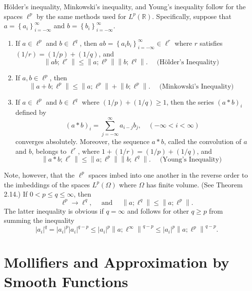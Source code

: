 Hölder's inequality, Minkowski's inequality, and Young's inequality follow for the spaces $\ell^p$ by the same methods used for $L^p(\mathbb{R})$. Specifically, suppose that $a=\left\{a_i\right\}_{i=-\infty}^{\infty}$ and $b=\left\{b_i\right\}_{i=-\infty}^{\infty}$.
\begin{enumerate}[label = (\alph*)]
  \item If $a \in \ell^p$ and $b \in \ell^q$, then $a b=\left\{a_i b_i\right\}_{i=-\infty}^{\infty} \in \ell^r$ where $r$ satisfies $(1 / r)=(1 / p)+(1 / q)$, and
  \[
  \left\|a b ; \ell^r\right\| \leq\left\|a ; \ell^p\right\|\left\|b ; \ell^q\right\| . \quad \text { (Hölder's Inequality) }
  \]
  \item If $a, b \in \ell^p$, then
  \[
  \left\|a+b ; \ell^p\right\| \leq\left\|a ; \ell^p\right\|+\left\|b ; \ell^p\right\| . \quad \text { (Minkowski's Inequality) }
  \]
  \item If $a \in \ell^p$ and $b \in \ell^q$ where $(1 / p)+(1 / q) \geq 1$, then the series $(a * b)_i$ defined by
  \[
  (a * b)_i=\sum_{j=-\infty}^{\infty} a_{i-j} b_j, \quad(-\infty<i<\infty)
  \]
  converges absolutely. Moreover, the sequence $a * b$, called the convolution of $a$ and $b$, belongs to $\ell^r$, where $1+(1 / r)=(1 / p)+(1 / q)$, and
  \[
  \left\|a * b ; \ell^r\right\| \leq\left\|a ; \ell^p\right\|\left\|b ; \ell^q\right\| . \quad \text { (Young's Inequality) }
  \]
\end{enumerate}

Note, however, that the $\ell^p$ spaces imbed into one another in the reverse order to the imbeddings of the spaces $L^p(\Omega)$ where $\Omega$ has finite volume. (See Theorem 2.14.) If $0<p \leq q \leq \infty$, then
\[
\ell^p \rightarrow \ell^q, \quad \text { and } \quad\left\|a ; \ell^q\right\| \leq\left\|a ; \ell^p\right\| .
\]
The latter inequality is obvious if $q=\infty$ and follows for other $q \geq p$ from summing the inequality
\[
\left|a_i\right|^q=\left|a_i\right|^p\left|a_i\right|^{q-p} \leq\left|a_i\right|^p\left\|a ; \ell^{\infty}\right\|^{q-p} \leq\left|a_i\right|^p\left\|a ; \ell^p\right\|^{q-p} .
\]


\section{Mollifiers and Approximation by Smooth Functions}

